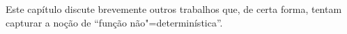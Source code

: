 Este capítulo discute brevemente outros trabalhos que,
de certa forma,
tentam capturar a noção de ``função não"=determinística''.
